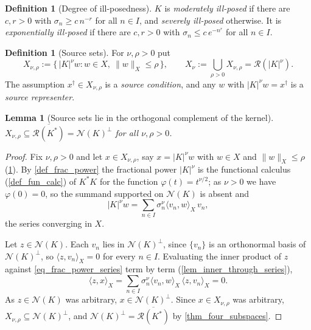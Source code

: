 \documentclass[a4paper]{report}
\theoremstyle{plain}
\newtheorem{lemma}[theorem]{Lemma}
\theoremstyle{definition}
\newtheorem{definition}[theorem]{Definition}
\theoremstyle{remark}
\newcommand{\Ran}{\mathcal{R}}
\newcommand{\Ker}{\mathcal{N}}
\newcommand{\dg}{^{\dagger}}
\begin{document}
\begin{definition}[Degree of ill-posedness]
  \label{def_degree_illposed}
  $K$ is \emph{moderately ill-posed} if there are $c, r > 0$ with $\sigma_n \ge c\,n^{-r}$
  for all $n \in I$, and \emph{severely ill-posed} otherwise.  It is \emph{exponentially
  ill-posed} if there are $c, r > 0$ with $\sigma_n \le c\,e^{-n^{r}}$ for all $n \in I$.
\end{definition}


\begin{definition}[Source sets]
  \label{def_source_set}
  For $\nu, \rho > 0$ put
  \[
    X_{\nu,\rho} := \{\, |K|^{\nu} w : w \in X,\ \|w\|_X \le \rho \,\},
    \qquad
    X_{\nu} := \bigcup_{\rho > 0} X_{\nu,\rho} = \Ran(|K|^{\nu}) .
  \]
  The assumption $x\dg \in X_{\nu,\rho}$ is a \emph{source condition}, and any $w$ with
  $|K|^{\nu}w = x\dg$ is a \emph{source representer}.
\end{definition}


\begin{lemma}[Source sets lie in the orthogonal complement of the kernel]
  \label{lem_source_in_kerperp}
  $X_{\nu,\rho} \subseteq \overline{\Ran(K^{*})} = \Ker(K)^{\perp}$ for all
  $\nu, \rho > 0$.
\end{lemma}

\begin{proof}
  Fix $\nu, \rho > 0$ and let $x \in X_{\nu,\rho}$, say $x = |K|^{\nu}w$ with $w \in X$
  and $\|w\|_X \le \rho$ (\cref{def_source_set}).  By \cref{def_frac_power} the fractional
  power $|K|^{\nu}$ is the functional calculus (\cref{def_fun_calc}) of $K^{*}K$ for the
  function $\varphi(t) = t^{\nu/2}$; as $\nu > 0$ we have $\varphi(0) = 0$, so the summand
  supported on $\Ker(K)$ is absent and
  \begin{equation}\label{eq_frac_power_series}
    |K|^{\nu}w = \sum_{n \in I}\sigma_n^{\nu}\langle v_n, w\rangle_X\, v_n ,
  \end{equation}
  the series converging in $X$.

  Let $z \in \Ker(K)$.  Each $v_n$ lies in $\Ker(K)^{\perp}$, since $\{v_n\}$ is an
  orthonormal basis of $\Ker(K)^{\perp}$, so $\langle z, v_n\rangle_X = 0$ for every
  $n \in I$.  Evaluating the inner product of $z$ against
  \eqref{eq_frac_power_series} term by term (\cref{lem_inner_through_series}),
  \[
    \langle z, x\rangle_X
      = \sum_{n \in I}\sigma_n^{\nu}\langle v_n, w\rangle_X\,\langle z, v_n\rangle_X = 0 .
  \]
  As $z \in \Ker(K)$ was arbitrary, $x \in \Ker(K)^{\perp}$.  Since $x \in X_{\nu,\rho}$
  was arbitrary, $X_{\nu,\rho} \subseteq \Ker(K)^{\perp}$, and
  $\Ker(K)^{\perp} = \overline{\Ran(K^{*})}$ by \cref{thm_four_subspaces}.
\end{proof}
\end{document}
